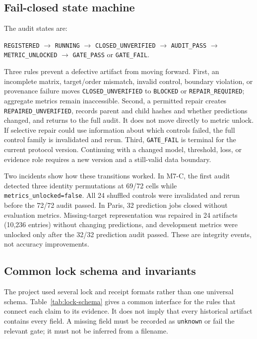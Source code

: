 \subsection{Fail-closed state machine}
\label{sec:appendix-state-machine}
\label{app:fail-closed}

The audit states are:

\begin{center}
\texttt{REGISTERED} $\rightarrow$ \texttt{RUNNING} $\rightarrow$ \texttt{CLOSED\_UNVERIFIED} $\rightarrow$ \texttt{AUDIT\_PASS} $\rightarrow$ \texttt{METRIC\_UNLOCKED} $\rightarrow$ \texttt{GATE\_PASS} or \texttt{GATE\_FAIL}.
\end{center}

Three rules prevent a defective artifact from moving forward.  First, an incomplete matrix, target/order mismatch, invalid control, boundary violation, or provenance failure moves \texttt{CLOSED\_UNVERIFIED} to \texttt{BLOCKED} or \texttt{REPAIR\_REQUIRED}; aggregate metrics remain inaccessible.  Second, a permitted repair creates \texttt{REPAIRED\_UNVERIFIED}, records parent and child hashes and whether predictions changed, and returns to the full audit.  It does not move directly to metric unlock.  If selective repair could use information about which controls failed, the full control family is invalidated and rerun.  Third, \texttt{GATE\_FAIL} is terminal for the current protocol version.  Continuing with a changed model, threshold, loss, or evidence role requires a new version and a still-valid data boundary.

Two incidents show how these transitions worked.  In M7-C, the first audit detected three identity permutations at 69/72 cells while \texttt{metrics\_unlocked=false}.  All 24 shuffled controls were invalidated and rerun before the 72/72 audit passed.  In Paris, 32 prediction jobs closed without evaluation metrics.  Missing-target representation was repaired in 24 artifacts (10,236 entries) without changing predictions, and development metrics were unlocked only after the 32/32 prediction audit passed.  These are integrity events, not accuracy improvements.

\subsection{Common lock schema and invariants}
\label{sec:appendix-lock-schema}

The project used several lock and receipt formats rather than one universal schema.  Table~\ref{tab:lock-schema} gives a common interface for the rules that connect each claim to its evidence.  It does not imply that every historical artifact contains every field.  A missing field must be recorded as \texttt{unknown} or fail the relevant gate; it must not be inferred from a filename.

